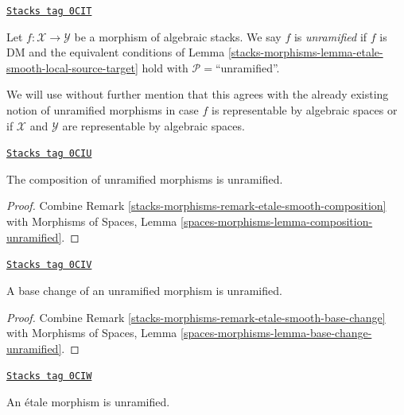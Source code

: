 \begin{definition}[Unramified]
\label{stacks-morphisms-definition-unramified}
\href{https://stacks.math.columbia.edu/tag/0CIT}{\texttt{Stacks tag 0CIT}}

Let $f : \mathcal{X} \to \mathcal{Y}$ be a morphism of algebraic stacks.
We say $f$ is {\it unramified} if $f$ is DM and the equivalent conditions of
Lemma \ref{stacks-morphisms-lemma-etale-smooth-local-source-target}
hold with $\mathcal{P} =$``unramified''.
\end{definition}

We will use without further mention that this agrees with the already
existing notion of unramified morphisms in case $f$ is representable
by algebraic spaces or if $\mathcal{X}$ and $\mathcal{Y}$ are
representable by algebraic spaces.

\begin{lemma}
\label{stacks-morphisms-lemma-composition-unramified}
\href{https://stacks.math.columbia.edu/tag/0CIU}{\texttt{Stacks tag 0CIU}}

The composition of unramified morphisms is unramified.
\end{lemma}

\begin{proof}
Combine Remark \ref{stacks-morphisms-remark-etale-smooth-composition}
with
Morphisms of Spaces, Lemma \ref{spaces-morphisms-lemma-composition-unramified}.
\end{proof}

\begin{lemma}
\label{stacks-morphisms-lemma-base-change-unramified}
\href{https://stacks.math.columbia.edu/tag/0CIV}{\texttt{Stacks tag 0CIV}}

A base change of an unramified morphism is unramified.
\end{lemma}

\begin{proof}
Combine
Remark \ref{stacks-morphisms-remark-etale-smooth-base-change}
with
Morphisms of Spaces, Lemma \ref{spaces-morphisms-lemma-base-change-unramified}.
\end{proof}

\begin{lemma}
\label{stacks-morphisms-lemma-etale-unramified}
\href{https://stacks.math.columbia.edu/tag/0CIW}{\texttt{Stacks tag 0CIW}}

An \'etale morphism is unramified.
\end{lemma}

